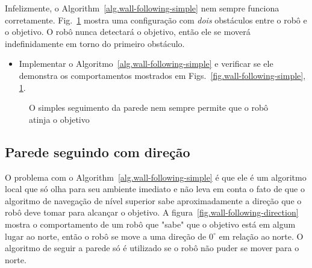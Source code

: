 Infelizmente, o Algorithm~\ref{alg.wall-following-simple} nem sempre funciona corretamente.  Fig.~\ref{fig.wall-following-simple-bug} mostra uma configuração com \emph{dois} obstáculos entre o robô e o objetivo. O robô nunca detectará o objetivo, então ele se moverá indefinidamente em torno do primeiro obstáculo.


\begin{framed}
\begin{itemize}
\item Implementar o Algoritmo~\ref{alg.wall-following-simple} e verificar se ele demonstra os comportamentos mostrados em Figs.~\ref{fig.wall-following-simple}, \ref{fig.wall-following-simple-bug}.
\end{itemize}
\end{framed}

\begin{figure}
\begin{center}
\caption{O simples seguimento da parede nem sempre permite que o robô atinja o objetivo}\label{fig.wall-following-simple-bug}
\end{center}
\end{figure}

\subsection{Parede seguindo com direção}

O problema com o Algorithm~\ref{alg.wall-following-simple} é que ele é um algoritmo local que só olha para seu ambiente imediato e não leva em conta o fato de que o algoritmo de navegação de nível superior sabe aproximadamente a direção que o robô deve tomar para alcançar o objetivo. A figura~\ref{fig.wall-following-direction} mostra o comportamento de um robô que "sabe" que o objetivo está em algum lugar ao norte, então o robô se move a uma direção de $0^\circ$ em relação ao norte. O algoritmo de seguir a parede só é utilizado se o robô não puder se mover para o norte.

